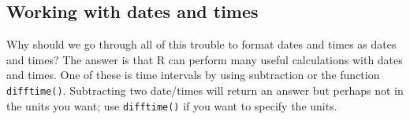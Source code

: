 \documentclass[
  13,
  letterpaper,
]{report}
\newenvironment{Shaded}{\begin{snugshade}}{\end{snugshade}}
\newcommand{\AttributeTok}[1]{\textcolor[rgb]{0.40,0.45,0.13}{#1}}
\newcommand{\CommentTok}[1]{\textcolor[rgb]{0.37,0.37,0.37}{#1}}
\newcommand{\DocumentationTok}[1]{\textcolor[rgb]{0.37,0.37,0.37}{\textit{#1}}}
\newcommand{\FunctionTok}[1]{\textcolor[rgb]{0.28,0.35,0.67}{#1}}
\newcommand{\NormalTok}[1]{\textcolor[rgb]{0.00,0.23,0.31}{#1}}
\newcommand{\OtherTok}[1]{\textcolor[rgb]{0.00,0.23,0.31}{#1}}
\newcommand{\SpecialCharTok}[1]{\textcolor[rgb]{0.37,0.37,0.37}{#1}}
\newcommand{\StringTok}[1]{\textcolor[rgb]{0.13,0.47,0.30}{#1}}
\begin{document}
\begin{Shaded}
\end{Shaded}

\subsection{Working with dates and times}\label{sec-05-date-work}

Why should we go through all of this trouble to format dates and times
as dates and times? The answer is that R can perform many useful
calculations with dates and times. One of these is time intervals by
using subtraction or the function \texttt{difftime()}. Subtracting two
date/times will return an answer but perhaps not in the units you want;
use \texttt{difftime()} if you want to specify the units.
\end{document}

